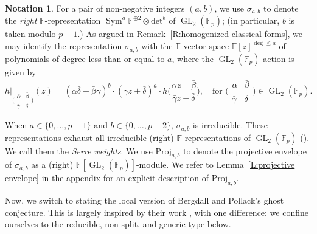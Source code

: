 \documentclass[12pt]{amsart}
\theoremstyle{definition}
\newtheorem{notation}[subsection]{Notation}
\numberwithin{equation}{subsection}
\def\FF{\mathbb{F}}
\newcommand{\Proj}{\mathrm{Proj}}
\DeclareMathOperator{\GL}{GL}
\DeclareMathOperator{\Sym}{Sym}
\renewcommand{\det}{\mathrm{det}}
\newcommand{\Matrix}[4]{{\big(\begin{smallmatrix}#1&#2\\#3& #4\end{smallmatrix} \big)}}
\begin{document}
\begin{notation}
\label{N:Serre weights}
For a pair of non-negative integers $(a,b)$, we use $\sigma_{a,b}$ to denote the \emph{right} $\FF$-representation $\Sym^a\FF^{\oplus 2} \otimes \det^b$ of $\GL_2(\FF_p)$; (in particular, $b$ is taken modulo $p-1$.) As argued in Remark~\ref{R:homogenized classical forms}, we may identify the representation $\sigma_{a,b}$ with the
$\FF$-vector space $\FF[z]^{\deg \leq a}$ of polynomials of degree less than or equal to $a$, where the $\GL_2(\FF_p)$-action is given by
$$
h|_{\Matrix {\bar \alpha}{\bar\beta}{\bar\gamma}{\bar\delta}}(z) =(\bar\alpha\bar\delta-\bar\beta\bar\gamma)^b \cdot  (\bar\gamma z+\bar\delta)^{a}\cdot  h\Big( \frac{\bar\alpha z+\bar\beta}{\bar\gamma z+\bar\delta}\Big), \quad \textrm{for }\Matrix {\bar \alpha}{\bar\beta}{\bar\gamma}{\bar\delta} \in \GL_2(\FF_p).
$$

When $a \in \{0, \dots, p-1\}$ and $b \in \{0, \dots, p-2\}$, $\sigma_{a,b}$ is irreducible. These representations exhaust all irreducible (right) $\FF$-representations of $\GL_2(\FF_p)$ (\cite[Proposition~1]{Barthel-Livne}). We call them the \emph{Serre weights}.
We use $\Proj_{a,b}$ to denote the projective envelope of $\sigma_{a,b}$ as a (right) $\FF[\GL_2(\FF_p)]$-module. We refer to Lemma~\ref{L:projective envelope} in the appendix for an explicit description of $\Proj_{a,b}$.
\end{notation}



Now, we switch to stating the local version of Bergdall and Pollack's ghost conjecture. This is largely inspired by their work
\cite{bergdall-pollack2,bergdall-pollack3}, with one difference: we confine ourselves to the reducible, non-split, and generic type below.
\end{document}
